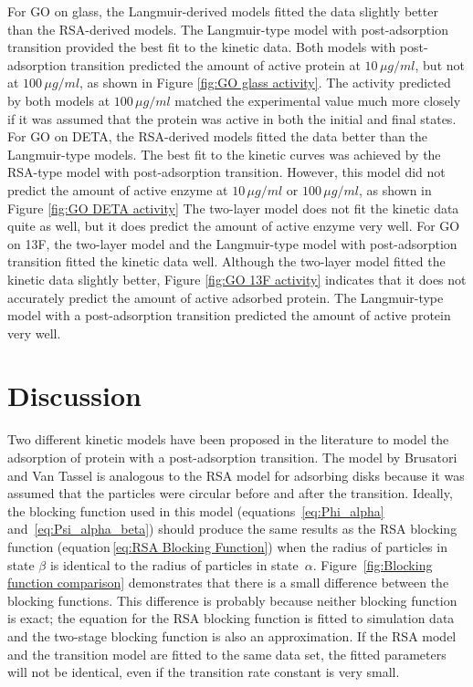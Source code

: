For GO on glass, the Langmuir-derived models fitted the data slightly
better than the RSA-derived models. The Langmuir-type model with post-adsorption
transition provided the best fit to the kinetic data. Both models
with post-adsorption transition predicted the amount of active protein
at $10\,\mu g/ml$, but not at $100\,\mu g/ml$, as shown in Figure
\ref{fig:GO glass activity}. The activity predicted by both models
at $100\,\mu g/ml$ matched the experimental value much more closely
if it was assumed that the protein was active in both the initial
and final states. For GO on DETA, the RSA-derived models fitted the
data better than the Langmuir-type models. The best fit to the kinetic
curves was achieved by the RSA-type model with post-adsorption transition.
However, this model did not predict the amount of active enzyme at
$10\,\mu g/ml$ or $100\,\mu g/ml$, as shown in Figure \ref{fig:GO DETA activity}
The two-layer model does not fit the kinetic data quite as well, but
it does predict the amount of active enzyme very well. For GO on 13F,
the two-layer model and the Langmuir-type model with post-adsorption
transition fitted the kinetic data well. Although the two-layer model
fitted the kinetic data slightly better, Figure \ref{fig:GO 13F activity}
indicates that it does not accurately predict the amount of active
adsorbed protein. The Langmuir-type model with a post-adsorption transition
predicted the amount of active protein very well.


\section{Discussion}

Two different kinetic models have been proposed in the literature
to model the adsorption of protein with a post-adsorption transition.
The model by Brusatori and Van Tassel \cite{Brusatori1999} is analogous
to the RSA model for adsorbing disks because it was assumed that the
particles were circular before and after the transition. Ideally,
the blocking function used in this model (equations~\ref{eq:Phi_alpha}
and~\ref{eq:Psi_alpha_beta}) should produce the same results as
the RSA blocking function (equation\,\ref{eq:RSA Blocking Function})
when the radius of particles in state $\beta$ is identical to the
radius of particles in state~$\alpha$. Figure~\ref{fig:Blocking function comparison}
demonstrates that there is a small difference between the blocking
functions. This difference is probably because neither blocking function
is exact; the equation for the RSA blocking function is fitted to
simulation data and the two-stage blocking function is also an approximation.
If the RSA model and the transition model are fitted to the same data
set, the fitted parameters will not be identical, even if the transition
rate constant is very small.

